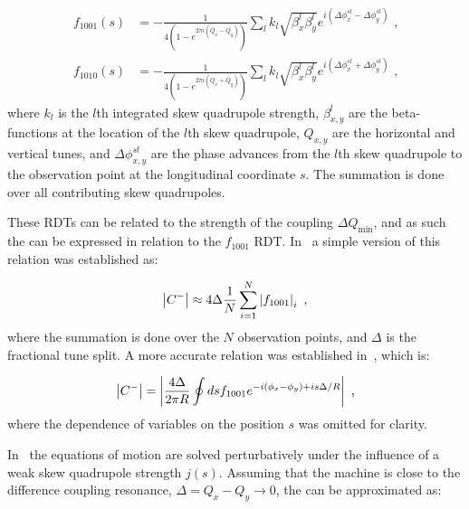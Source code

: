 \begin{equation}
    \begin{aligned}
        f_{1001}(s) &= - \frac{1}{4 \left(1 - e^{2 \pi i \left(Q_x - Q_y \right)}\right)} \sum_l k_l \sqrt{\beta_x^l \beta_y^l} e^{i \left(\Delta \phi_x^{s l} - \Delta \phi_y^{s l}\right)} \text{ ,} \\
        f_{1010}(s) &= - \frac{1}{4 \left(1 - e^{2 \pi i \left(Q_x + Q_y \right)}\right)} \sum_l k_l \sqrt{\beta_x^l \beta_y^l} e^{i \left(\Delta \phi_x^{s l} + \Delta \phi_y^{s l}\right)} \text{ ,}
    \end{aligned}
    \label{equation:coupling_rdts_from_skew_quads}
\end{equation}
where \(k_l\) is the \(l\)th integrated \gls{skew} quadrupole strength, \(\beta_{x,y}^{l}\) are the \glspl{beta-function} at the location of the \(l\)th skew quadrupole, \(Q_{x,y}\) are the horizontal and vertical tunes, and \(\Delta \phi_{x,y}^{s l}\) are the phase advances from the \(l\)th skew quadrupole to the observation point at the longitudinal coordinate \(s\).
The summation is done over all contributing \gls{skew} quadrupoles.

These \glspl{RDT} can be related to the strength of the coupling \(\Delta Q_{\mathrm{min}}\), and as such the  can be expressed in relation to the \(f_{1001}\) \gls{RDT}.
In~\cite{PHD:Franchi} a simple version of this relation was established as:

\begin{equation}
    \left\lvert C^{-} \right\rvert \approx 4 \Delta \frac{1}{N} \sum_{i=1}^N \left\lvert f_{1001} \right\rvert_i \text{ ,}
    \label{equation:deltaqmin_from_f1001_franchi}
\end{equation}
where the summation is done over the \(N\) observation points, and \(\Delta\) is the fractional tune split.
A more accurate relation was established in~\cite{PRAB:Persson:Improved_Control_Betatron_Coupling}, which is:

\begin{equation}
    \left\lvert C^{-} \right\rvert = \left\lvert \frac{4 \Delta}{2 \pi R} \oint d s f_{1001} e^{-i \left(\phi_x - \phi_y \right) + i s \Delta / R}  \right\rvert \text{ ,}
    \label{equation:deltaqmin_from_f1001}
\end{equation}
where the dependence of variables on the position \(s\) was omitted for clarity.

In~\cite{PHREV:Guignard:Betatron_Coupling_Radiation} the equations of motion are solved perturbatively under the influence of a weak \gls{skew} quadrupole strength \(j(s)\).
Assuming that the machine is close to the difference coupling resonance, \(\Delta = Q_x - Q_y \rightarrow 0\), the  can be approximated as:

